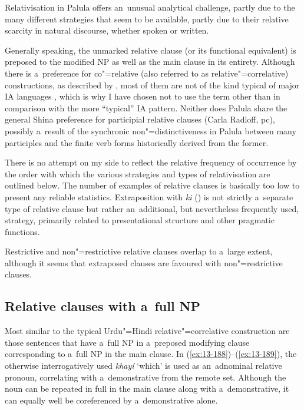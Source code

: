 Relativisation in Palula offers an~unusual analytical challenge, partly due to the many different strategies that seem to be available, partly due to their relative scarcity in natural discourse, whether spoken or written. 



Generally speaking, the unmarked relative clause (or its functional equivalent) is preposed to the modified NP as well as the main clause in its entirety. Although there is a~preference for co"=relative (also referred to as relative"=correlative) constructions, as described by \citet{downing1974}, most of them are not of the kind typical of major IA languages \citep[410--415]{masica1991}, which is why I have chosen not to use the term other than in comparison with the more ``typical'' IA pattern. Neither does Palula share the general Shina preference for participial relative clauses (Carla Radloff, pc), possibly a~result of the synchronic non"=distinctiveness in Palula between many participles and the finite verb forms historically derived from the former.



There is no attempt on my side to reflect the relative frequency of occurrence by the order with which the various strategies and types of relativisation are outlined below. The number of examples of relative clauses is basically too low to present any reliable statistics. Extraposition with \textit{ki} () is not strictly a~separate type of relative clause but rather an~additional, but nevertheless frequently used, strategy, primarily related to presentational structure and other pragmatic functions.



Restrictive and non"=restrictive relative clauses overlap to a~large extent, although it seems that extraposed clauses are favoured with non"=restrictive clauses.


\subsection{Relative clauses with a~full NP}
\label{subsec:13-6-1}


Most similar to the typical Urdu"=Hindi relative"=correlative construction are those sentences that have a~full NP in a~preposed modifying clause corresponding to a~full NP in the main clause. In (\ref{ex:13-188})--(\ref{ex:13-189}), the otherwise interrogatively used \textit{khayí} `which' is used as an~adnominal relative pronoun, correlating with a~demonstrative from the remote set. Although the noun can be repeated in full in the main clause along with a~demonstrative, it can equally well be coreferenced by a~demonstrative alone.



